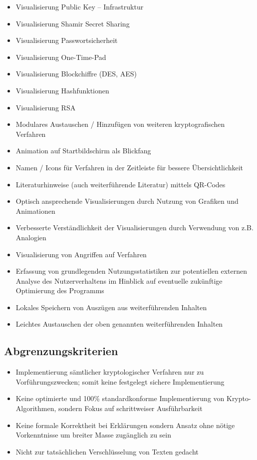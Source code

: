 \documentclass{article}
\begin{document}
\begin{itemize}
    \item Visualisierung Public Key – Infrastruktur
    \item Visualisierung Shamir Secret Sharing
    \item Visualisierung Passwortsicherheit
    \item Visualisierung One-Time-Pad
    \item Visualisierung Blockchiffre (DES, AES)
    \item Visualisierung Hashfunktionen
    \item Visualisierung RSA
    \item Modulares Austauschen / Hinzufügen von weiteren kryptografischen Verfahren
    \item Animation auf Startbildschirm als Blickfang
    \item Namen / Icons für Verfahren in der Zeitleiste für bessere Übersichtlichkeit
    \item Literaturhinweise (auch weiterführende Literatur) mittels QR-Codes
    \item Optisch ansprechende Visualisierungen durch Nutzung von Grafiken und Animationen
    \item Verbesserte Verständlichkeit der Visualisierungen durch Verwendung von z.B. Analogien
    \item Visualisierung von Angriffen auf Verfahren
    \item Erfassung von grundlegenden Nutzungsstatistiken zur potentiellen externen Analyse des Nutzerverhaltens  im Hinblick auf eventuelle zukünftige Optimierung des Programms
    \item Lokales Speichern von Auszügen aus weiterführenden Inhalten
    \item Leichtes Austauschen der oben genannten weiterführenden Inhalten
\end{itemize}

\subsection{Abgrenzungskriterien}
\begin{itemize}
	\item Implementierung sämtlicher kryptologischer Verfahren nur zu Vorführungszwecken; somit keine festgelegt sichere Implementierung
    \item Keine optimierte und 100\% standardkonforme Implementierung von Krypto-Algorithmen,
        sondern Fokus auf schrittweiser Ausführbarkeit
    \item Keine formale Korrektheit bei Erklärungen sondern Ansatz ohne nötige Vorkenntnisse
        um breiter Masse zugänglich zu sein
    \item Nicht zur tatsächlichen Verschlüsselung von Texten gedacht
\end{itemize}
\end{document}
